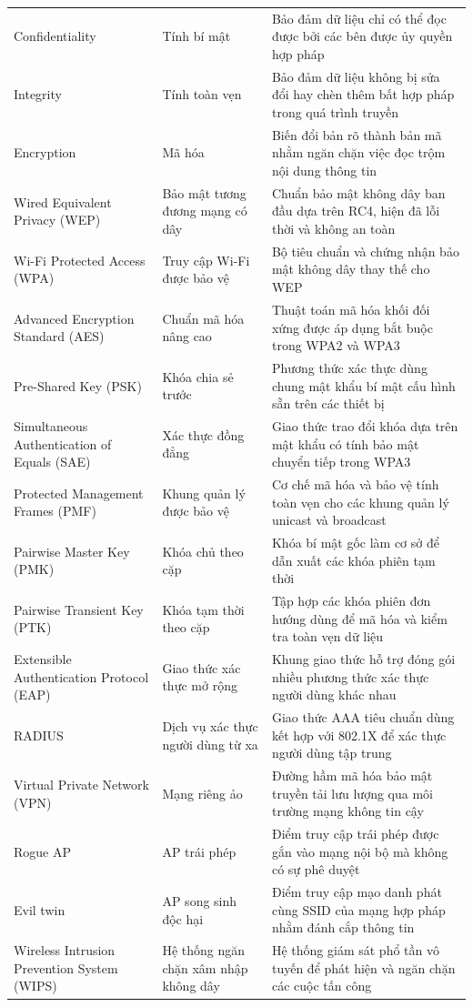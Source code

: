 \begin{xltabular}{\linewidth}{@{} L{0.8} L{0.8} L{1.4} @{}}
  Confidentiality & Tính bí mật & Bảo đảm dữ liệu chỉ có thể đọc được bởi các bên được ủy quyền hợp pháp\\
  Integrity & Tính toàn vẹn & Bảo đảm dữ liệu không bị sửa đổi hay chèn thêm bất hợp pháp trong quá trình truyền\\
  Encryption & Mã hóa & Biến đổi bản rõ thành bản mã nhằm ngăn chặn việc đọc trộm nội dung thông tin\\
  Wired Equivalent Privacy (WEP) & Bảo mật tương đương mạng có dây & Chuẩn bảo mật không dây ban đầu dựa trên RC4, hiện đã lỗi thời và không an toàn\\
  Wi-Fi Protected Access (WPA) & Truy cập Wi-Fi được bảo vệ & Bộ tiêu chuẩn và chứng nhận bảo mật không dây thay thế cho WEP\\
  Advanced Encryption Standard (AES) & Chuẩn mã hóa nâng cao & Thuật toán mã hóa khối đối xứng được áp dụng bắt buộc trong WPA2 và WPA3\\
  Pre-Shared Key (PSK) & Khóa chia sẻ trước & Phương thức xác thực dùng chung mật khẩu bí mật cấu hình sẵn trên các thiết bị\\
  Simultaneous Authentication of Equals (SAE) & Xác thực đồng đẳng & Giao thức trao đổi khóa dựa trên mật khẩu có tính bảo mật chuyển tiếp trong WPA3\\
  Protected Management Frames (PMF) & Khung quản lý được bảo vệ & Cơ chế mã hóa và bảo vệ tính toàn vẹn cho các khung quản lý unicast và broadcast\\
  Pairwise Master Key (PMK) & Khóa chủ theo cặp & Khóa bí mật gốc làm cơ sở để dẫn xuất các khóa phiên tạm thời\\
  Pairwise Transient Key (PTK) & Khóa tạm thời theo cặp & Tập hợp các khóa phiên đơn hướng dùng để mã hóa và kiểm tra toàn vẹn dữ liệu\\
  Extensible Authentication Protocol (EAP) & Giao thức xác thực mở rộng & Khung giao thức hỗ trợ đóng gói nhiều phương thức xác thực người dùng khác nhau\\
  RADIUS & Dịch vụ xác thực người dùng từ xa & Giao thức AAA tiêu chuẩn dùng kết hợp với 802.1X để xác thực người dùng tập trung\\
  Virtual Private Network (VPN) & Mạng riêng ảo & Đường hầm mã hóa bảo mật truyền tải lưu lượng qua môi trường mạng không tin cậy\\
  Rogue AP & AP trái phép & Điểm truy cập trái phép được gắn vào mạng nội bộ mà không có sự phê duyệt\\
  Evil twin & AP song sinh độc hại & Điểm truy cập mạo danh phát cùng SSID của mạng hợp pháp nhằm đánh cắp thông tin\\
  Wireless Intrusion Prevention System (WIPS) & Hệ thống ngăn chặn xâm nhập không dây & Hệ thống giám sát phổ tần vô tuyến để phát hiện và ngăn chặn các cuộc tấn công\\


\end{xltabular}
